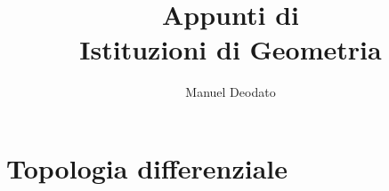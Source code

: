 \documentclass[12pt]{scrartcl}
\title{Appunti di\\ \vspace{.3cm} Istituzioni di Geometria}
\author{Manuel Deodato}
\date{}
\theoremstyle{style}
\renewcommand{\maketitle}{
\begin{center}
{\sffamily
{\fontsize{20}{20}\selectfont\MakeUppercase\thetitle}}

\vspace{0.2in}

{\large\scshape\theauthor}
\end{center}
}
\numberwithin{equation}{subsection}
\begin{document}
\maketitle
\newpage
\tableofcontents 
\newpage
\section{Topologia differenziale}
\end{document}
